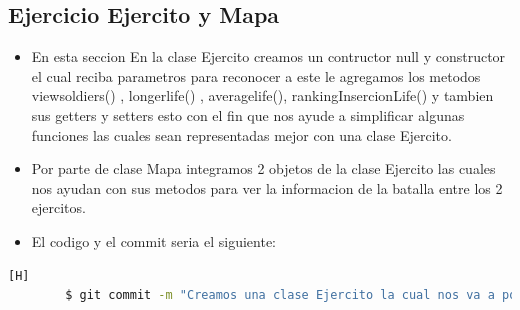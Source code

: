 \documentclass{article}
\begin{document}
	\subsection{Ejercicio Ejercito y Mapa}
	\begin{itemize}	
		\item En esta seccion En la clase Ejercito creamos un contructor null y constructor el cual reciba parametros para reconocer a este le agregamos los metodos viewsoldiers() , longerlife() , averagelife(),  rankingInsercionLife() y tambien sus getters y setters esto con el fin que nos ayude a simplificar algunas funciones las cuales sean representadas mejor con una clase Ejercito.
		\item Por parte de clase Mapa integramos 2 objetos de la clase Ejercito las cuales nos ayudan con sus metodos para ver la informacion de la batalla entre los 2 ejercitos.
		\item El codigo y el commit seria el siguiente:
	\end{itemize}	
	\begin{lstlisting}[language=bash,caption={Commit}][H]
		$ git commit -m "Creamos una clase Ejercito la cual nos va a poder ayudar al momento de querer datos de este como los soldados , el soldado de mayor vida promedio y tambien tenenemos en la clase Mapa la cual creamos objetos de esta clase Ejercito las cuales vamos a poder usar sus metodos"
	\end{lstlisting}	
\end{document}

